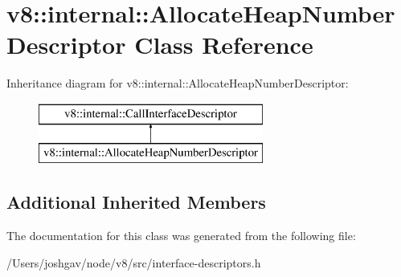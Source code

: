 \hypertarget{classv8_1_1internal_1_1_allocate_heap_number_descriptor}{}\section{v8\+:\+:internal\+:\+:Allocate\+Heap\+Number\+Descriptor Class Reference}
\label{classv8_1_1internal_1_1_allocate_heap_number_descriptor}
Inheritance diagram for v8\+:\+:internal\+:\+:Allocate\+Heap\+Number\+Descriptor\+:\begin{figure}[H]
\begin{center}
\leavevmode
\includegraphics[height=2.000000cm]{classv8_1_1internal_1_1_allocate_heap_number_descriptor}
\end{center}
\end{figure}
\subsection*{Additional Inherited Members}


The documentation for this class was generated from the following file\+:\begin{DoxyCompactItemize}
\item 
/\+Users/joshgav/node/v8/src/interface-\/descriptors.\+h\end{DoxyCompactItemize}

